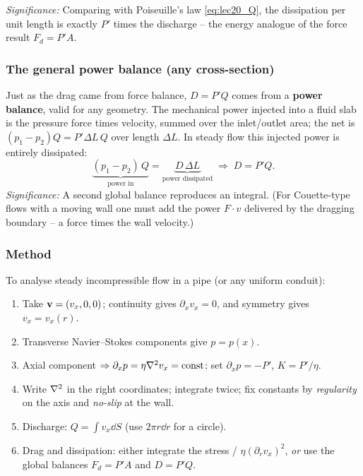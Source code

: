 \documentclass[../main.tex]{subfiles}
\begin{document}
\textit{Significance:} Comparing with Poiseuille's law \eqref{eq:lec20_Q}, the dissipation per unit length is exactly $P'$ times the discharge -- the energy analogue of the force result $F_d=P'A$.

\subsubsection*{The general power balance (any cross-section)}
Just as the drag came from force balance, $D=P'Q$ comes from a \textbf{power balance}, valid for any geometry. The mechanical power injected into a fluid slab is the pressure force times velocity, summed over the inlet/outlet area; the net is $(p_1-p_2)Q=P'\Delta L\,Q$ over length $\Delta L$. In steady flow this injected power is entirely dissipated:
\begin{equation}
  \underbrace{(p_1-p_2)\,Q}_{\text{power in}}=\underbrace{D\,\Delta L}_{\text{power dissipated}}
  \;\Longrightarrow\; D=P'Q .
  \label{eq:lec20_power_balance}
\end{equation}
\textit{Significance:} A second global balance reproduces an integral. (For Couette-type flows with a moving wall one must add the power $F\cdot v$ delivered by the dragging boundary -- a force times the wall velocity.)

\subsubsection*{Method}
To analyse steady incompressible flow in a pipe (or any uniform conduit):
\begin{enumerate}
  \item Take $\mathbf{v}=(v_x,0,0)$; continuity gives $\partial_x v_x=0$, and symmetry gives $v_x=v_x(r)$.
  \item Transverse Navier--Stokes components give $p=p(x)$.
  \item Axial component $\Rightarrow \partial_x p=\eta\nabla^2 v_x=\text{const}$; set $\partial_x p=-P'$, $K=P'/\eta$.
  \item Write $\nabla^2$ in the right coordinates; integrate twice; fix constants by \emph{regularity} on the axis and \emph{no-slip} at the wall.
  \item Discharge: $Q=\int v_x\dd{S}$ (use $2\pi r\dd{r}$ for a circle).
  \item Drag and dissipation: either integrate the stress / $\eta(\partial_r v_x)^2$, \emph{or} use the global balances $F_d=P'A$ and $D=P'Q$.
\end{enumerate}
\end{document}
